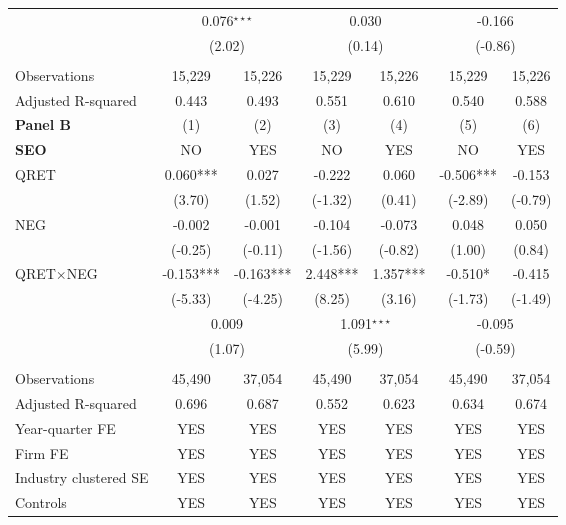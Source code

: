\begin{table}[htbp]
\begin{tabular}{lcccccc}
    \rowcolor[rgb]{ .933,  .925,  .882} \multicolumn{1}{l}{Diff. QRET$\times$NEG} & \multicolumn{2}{c}{0.076$^{\star\star\star}$} & \multicolumn{2}{c}{0.030} & \multicolumn{2}{c}{-0.166} \\
    \rowcolor[rgb]{ .933,  .925,  .882}  & \multicolumn{2}{c}{(2.02)} & \multicolumn{2}{c}{(0.14)} & \multicolumn{2}{c}{(-0.86)} \\
      &   &   &   &   &   &  \\
    \multicolumn{1}{l}{Observations} & 15,229 & 15,226 & 15,229 & 15,226 & 15,229 & 15,226 \\
    \multicolumn{1}{l}{Adjusted R-squared} & 0.443 & 0.493 & 0.551 & 0.610 & 0.540 & 0.588 \\
    \midrule
    \textbf{Panel B}  & (1) & (2) & (3) & (4) & (5) & (6) \\
    \multicolumn{1}{l}{\textbf{SEO}} & NO & YES & NO & YES & NO & YES \\
    \cmidrule{2-7}
    QRET & 0.060*** & 0.027 & -0.222 & 0.060 & -0.506*** & -0.153 \\
    & (3.70) & (1.52) & (-1.32) & (0.41) & (-2.89) & (-0.79) \\
    NEG & -0.002 & -0.001 & -0.104 & -0.073 & 0.048 & 0.050 \\
    & (-0.25) & (-0.11) & (-1.56) & (-0.82) & (1.00) & (0.84) \\
    \rowcolor[rgb]{ .933,  .925,  .882} QRET$\times$NEG & -0.153*** & -0.163*** & 2.448*** & 1.357*** & -0.510* & -0.415 \\
    \rowcolor[rgb]{ .933,  .925,  .882} & (-5.33) & (-4.25) & (8.25) & (3.16) & (-1.73) & (-1.49) \\
    \rowcolor[rgb]{ .933,  .925,  .882} \multicolumn{1}{l}{Diff. QRET$\times$NEG} & \multicolumn{2}{c}{0.009} & \multicolumn{2}{c}{1.091$^{\star\star\star}$} & \multicolumn{2}{c}{-0.095} \\
    \rowcolor[rgb]{ .933,  .925,  .882}  & \multicolumn{2}{c}{(1.07)} & \multicolumn{2}{c}{(5.99)} & \multicolumn{2}{c}{(-0.59)} \\
    &   &   &   &   &   &  \\
    Observations & 45,490 & 37,054 & 45,490 & 37,054 & 45,490 & 37,054 \\
    Adjusted R-squared & 0.696 & 0.687 & 0.552 & 0.623 & 0.634 & 0.674 \\
    \midrule
    \multicolumn{1}{l}{Year-quarter FE} & YES & YES & YES & YES & YES & YES \\
    \multicolumn{1}{l}{Firm FE} & YES & YES & YES & YES & YES & YES \\
    \multicolumn{1}{l}{Industry clustered SE} & YES & YES & YES & YES & YES & YES \\
    \multicolumn{1}{l}{Controls} & YES & YES & YES & YES & YES & YES \\
    \bottomrule
    \bottomrule
    \end{tabular}%
\end{table}%
